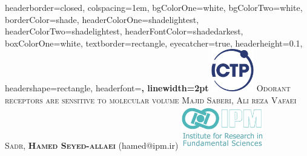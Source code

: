 \documentclass[a1paper,fontscale=0.5]{baposter} %
\begin{document}
\begin{poster}
{
headerborder=closed, %
colspacing=1em, %
bgColorOne=white, %
bgColorTwo=white, %
borderColor=shade, %
headerColorOne=shadelightest, %
headerColorTwo=shadelightest, %
headerFontColor=shadedarkest, %
boxColorOne=white, %
textborder=rectangle, %
eyecatcher=true, %
headerheight=0.1\textheight, %
headershape=rectangle, %
headerfont=\Large\bf\textsc, %
linewidth=2pt %
}
%
{\includegraphics[height=5em]{fig/ICTP_logo}} %
{\huge \textsc{Odorant receptors are sensitive to molecular volume}} %
{\textsc{ Majid Saberi, Ali reza Vafaei Sadr, \bf{Hamed Seyed-allaei} \vspace{0.5em} }(hamed@ipm.ir)}
{\includegraphics[height=5em]{fig/logo.jpg}} %



\end{poster}
\end{document}
